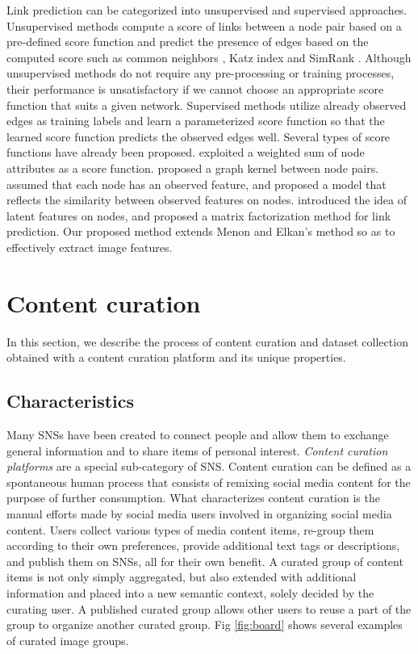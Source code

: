 \documentclass[letterpaper]{article} %
\begin{document}
Link prediction can be categorized into unsupervised and supervised approaches.
%
Unsupervised methods compute a score of links between a node pair based on a pre-defined score function and predict the presence of edges based on the computed score such as common neighbors \cite{Kossinets2006}, Katz index \cite{Katz1953} and SimRank \cite{Jeh2002}.
%
Although unsupervised methods do not require any pre-processing or training processes, their performance is unsatisfactory if we cannot choose an appropriate score function that suits a given network.
%
Supervised methods utilize already observed edges as training labels and learn a parameterized score function so that the learned score function predicts the observed edges well.
%
Several types of score functions have already been proposed.
%
\cite{Wang2007} exploited a weighted sum of node attributes as a score function.
%
\cite{Kashima2009} proposed a graph kernel between node pairs.
%
\cite{Scripps2008} assumed that each node has an observed feature, and proposed a model that reflects the similarity between observed features on nodes.
%
\cite{Menon2011} introduced the idea of latent features on nodes, and proposed a matrix factorization method for link prediction.
%
Our proposed method extends Menon and Elkan's method so as to effectively extract image features.


\section{Content curation}
\label{sec:curation}

In this section, we describe the process of content curation and dataset collection obtained with a content curation platform and its unique properties.

\subsection{Characteristics}
\label{sec:curation:def}
\indent

Many SNSs have been created to connect people and allow them to exchange general information and to share items of personal interest.
%
\textit{Content curation platforms} are a special sub-category of SNS.
%
Content curation can be defined as a spontaneous human process that consists of remixing social media content for the purpose of further consumption.
%
What characterizes content curation is the manual efforts made by social media users involved in organizing social media content.
%
Users collect various types of media content items, re-group them according to their own preferences, provide additional text tags or descriptions, and publish them on SNSs, all for their own benefit.
%
A curated group of content items is not only simply aggregated, but also extended with additional information and placed into a new semantic context, solely decided by the curating user.
%
A published curated group allows other users to reuse a part of the group to organize another curated group.
%
Fig \ref{fig:board} shows several examples of curated image groups.
\end{document}
